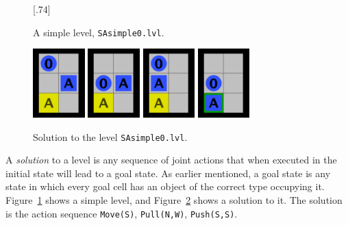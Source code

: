 \documentclass[12pt,a4paper]{article}
\newcommand{\showlevel}[2]{%
    \scalebox{1}[.74]{%
        \begin{minipage}{#2}
            \renewcommand{\baselinestretch}{0.8}
            
            \renewcommand{\baselinestretch}{1.0}
        \end{minipage}
    }
}
\begin{document}
\begin{figure}
\begin{center}
  \showlevel{levels/SAsimple0}{1.5cm}
\end{center}
\caption{A simple level, \texttt{SAsimple0.lvl}.}\label{figu:simple_level}
\end{figure}
\begin{figure}
\begin{center}
  \includegraphics[width=2cm]{simple0_1} 
\quad
\quad  
  \includegraphics[width=2cm]{simple0_2} 
\quad
\quad
  \includegraphics[width=2cm]{simple0_3} 
\quad
\quad
  \includegraphics[width=2cm]{simple0_4} 
  \end{center}
  \caption{Solution to the level \texttt{SAsimple0.lvl}.}\label{figu:simple_solution}
\end{figure}


A \emph{solution} to a level is any sequence of joint actions that when executed in the initial state will lead to a goal state. As earlier mentioned, a goal state is any state in which every goal cell has an object of the correct type occupying it. Figure~\ref{figu:simple_level} shows a simple level, and Figure~\ref{figu:simple_solution} shows a solution to it. The solution is the action sequence \texttt{Move(S)}, \texttt{Pull(N,W)}, \texttt{Push(S,S)}.
\end{document}
